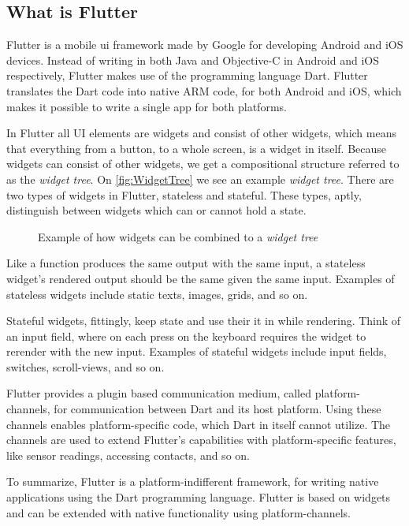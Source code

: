 \subsection{What is Flutter}

Flutter is a mobile \gls{ui} framework made by Google for developing Android and iOS devices\cite{flutterFAQ}. Instead of writing in both Java and Objective-C in Android and iOS respectively, Flutter makes use of the programming language Dart. Flutter translates the Dart code into native ARM code, for both Android and iOS, which makes it possible to write a single app for both platforms. 

In Flutter all UI elements are widgets and consist of other widgets, which means that everything from a  button, to a  whole screen, is a widget in itself. Because widgets can consist of other widgets, we get a compositional structure referred to as the \textit{widget tree}. On \autoref{fig:WidgetTree} we see an example \textit{widget tree}. There are two types of widgets in Flutter, stateless and stateful. These types, aptly, distinguish between widgets which can or cannot hold a state.

\begin{figure}[h]
    \centering
    \caption{Example of how widgets can be combined to a \textit{widget tree}}
    \label{fig:WidgetTree}
\end{figure}

Like a function produces the same output with the same input, a stateless widget's rendered output should be the same given the same input. Examples of stateless widgets include static texts, images, grids, and so on. 

Stateful widgets, fittingly, keep state and use their it in while rendering. Think of an input field, where on each press on the keyboard requires the widget to rerender with the new input. Examples of stateful widgets include input fields, switches, scroll-views, and so on.

Flutter provides a plugin based communication medium, called platform-channels, for communication between Dart and its host platform\cite{flutter_plugins}. Using these channels enables platform-specific code, which Dart in itself cannot utilize. The channels are used to extend Flutter's capabilities with platform-specific features, like sensor readings, accessing contacts, and so on.

To summarize, Flutter is a platform-indifferent framework, for writing native applications using the Dart programming language. Flutter is based on widgets and can be extended with native functionality using platform-channels.